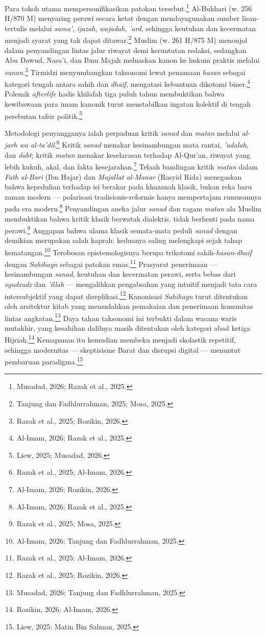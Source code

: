 Para tokoh utama mempersonifikasikan patokan tersebut.\footnote{Musadad, 2026; Razak et al., 2025.} Al-Bukhari (w. 256 H/870 M) menyaring perawi secara ketat dengan mendayagunakan sumber lisan-tertulis melalui \textit{sama'}, \textit{ijazah}, \textit{wajadah}, \textit{'ard}, sehingga keutuhan dan kecermatan menjadi syarat yang tak dapat ditawar.\footnote{Tanjung dan Fadhlurrahman, 2025; Mosa, 2025.} Muslim (w. 261 H/875 M) menonjol dalam penyandingan lintas jalur riwayat demi keruntutan redaksi, sedangkan Abu Dawud, Nasa'i, dan Ibnu Majah meluaskan kanon ke hukum praktis melalui \textit{sunan}.\footnote{Razak et al., 2025; Rozikin, 2026.} Tirmidzi menyumbangkan taksonomi lewat penamaan \textit{hasan} sebagai kategori tengah antara sahih dan \textit{dhaif}, mengatasi kebuntuan dikotomi biner.\footnote{Al-Imam, 2026; Razak et al., 2025.} Polemik \textit{afterlife} hadis khilafah tiga puluh tahun membuktikan bahwa kewibawaan para imam kanonik turut menstabilkan ingatan kolektif di tengah perebutan tafsir politik.\footnote{Liew, 2025; Musadad, 2026.}

Metodologi penyangganya ialah perpaduan kritik \textit{sanad} dan \textit{matan} melalui \textit{al-jarh wa al-ta'dil}.\footnote{Razak et al., 2025; Al-Imam, 2026.} Kritik \textit{sanad} menakar kesinambungan mata rantai, \textit{'adalah}, dan \textit{dabt}; kritik \textit{matan} menakar keselarasan terhadap Al-Qur'an, riwayat yang lebih kukuh, akal, dan fakta kesejarahan.\footnote{Al-Imam, 2026; Rozikin, 2026.} Telaah bandingan kritik \textit{matan} dalam \textit{Fath al-Bari} (Ibn Hajar) dan \textit{Majallat al-Manar} (Rasyid Rida) menegaskan bahwa kepedulian terhadap isi berakar pada khazanah klasik, bukan reka baru zaman modern --- polarisasi tradisionis-reformis hanya mempertajam rumusannya pada era modern.\footnote{Al-Imam, 2026; Razak et al., 2025.} Penyandingan aneka jalur \textit{sanad} dan ragam \textit{matan} ala Muslim membuktikan bahwa kritik klasik berwatak dialektis, tidak berhenti pada nama perawi.\footnote{Razak et al., 2025; Mosa, 2025.} Anggapan bahwa ulama klasik semata-mata peduli \textit{sanad} dengan demikian merupakan salah kaprah: keduanya saling melengkapi sejak tahap kematangan.\footnote{Al-Imam, 2026; Tanjung dan Fadhlurrahman, 2025.} Terobosan epistemologisnya berupa trikotomi sahih-\textit{hasan}-\textit{dhaif} dengan \textit{Sahihayn} sebagai patokan emas.\footnote{Razak et al., 2025; Al-Imam, 2026.} Prasyarat penerimaan --- kesinambungan \textit{sanad}, keutuhan dan kecermatan perawi, serta bebas dari \textit{syudzudz} dan \textit{'illah} --- mengalihkan pengabsahan yang intuitif menjadi tata cara intersubjektif yang dapat direplikasi.\footnote{Razak et al., 2025; Rozikin, 2026.} Kanonisasi \textit{Sahihayn} turut ditentukan oleh arsitektur kitab yang memudahkan pemakaian dan penerimaan komunitas lintas angkatan.\footnote{Musadad, 2026; Tanjung dan Fadhlurrahman, 2025.} Daya tahan taksonomi ini terbukti dalam wacana waris mutakhir, yang kesahihan dalilnya masih ditentukan oleh kategori abad ketiga Hijriah.\footnote{Rozikin, 2026; Al-Imam, 2026.} Kemapanan itu kemudian membeku menjadi skolastik repetitif, sehingga modernitas --- skeptisisme Barat dan disrupsi digital --- menuntut pembaruan paradigma.\footnote{Liew, 2025; Matin Bin Salman, 2025.}

